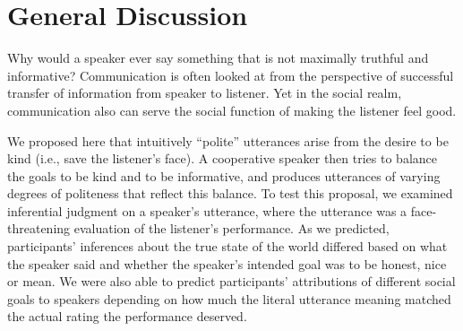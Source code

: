 \documentclass[10pt,letterpaper]{article}
\newcommand{\ndg}[1]{\textcolor{Green}{[ndg: #1]}}
\newcommand{\mht}[1]{\textcolor{DarkOrange}{[mht: #1]}}
\begin{document}



\section{General Discussion}


Why would a speaker ever say something that is not maximally truthful and informative?
Communication is often looked at from the perspective of successful transfer of information from speaker to listener.
Yet in the social realm, communication also can serve the social function of making the listener feel good.

We proposed here that intuitively ``polite'' utterances arise from the desire to be kind (i.e., save the listener's face). A cooperative speaker then tries to balance the goals to be kind and to be informative, and produces utterances of varying degrees of politeness that reflect this balance.
To test this proposal, we examined inferential judgment on a speaker's utterance, where the utterance was a face-threatening evaluation of the listener's performance.
As we predicted, participants' inferences about the true state of the world differed based on what the speaker said and whether the speaker's intended goal was to be honest, nice or mean.
We were also able to predict participants' attributions of different social goals to speakers depending on
how much the literal utterance meaning matched the actual rating the performance deserved.
\end{document}
